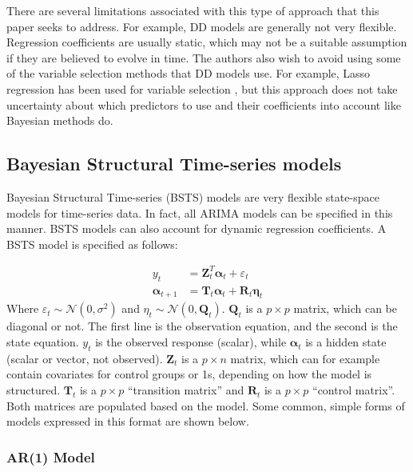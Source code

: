 \documentclass[12pt]{article}
\begin{document}
There are several limitations associated with this type of approach that this paper seeks to address. For example, DD models are generally not very flexible. Regression coefficients are usually static, which may not be a suitable assumption if they are believed to evolve in time. The authors also wish to avoid using some of the variable selection methods that DD models use. For example, Lasso regression has been used for variable selection \cite{belloni2015program}, but this approach does not take uncertainty about which predictors to use and their coefficients into account like Bayesian methods do.

\subsection{Bayesian Structural Time-series models}
Bayesian Structural Time-series (BSTS) models are very flexible state-space models for time-series data. In fact, all ARIMA models can be specified in this manner. BSTS models can also account for dynamic regression coefficients. A BSTS model is specified as follows:

\begin{align} 
y_t &= \boldsymbol{Z}_t^T\boldsymbol{\alpha}_t + \varepsilon_t\\ \label{eq}
\boldsymbol{\alpha}_{t+1} &= \boldsymbol{T}_t \boldsymbol{\alpha}_t + \boldsymbol{R}_t \boldsymbol{\eta}_t \label{eq1}
\end{align}
Where $\varepsilon_t \sim \mathcal{N}(0, \sigma^2)$ and 
$\eta_t \sim \mathcal{N}(0, \boldsymbol{Q}_t)$. $ \boldsymbol{Q}_t$ is a $p \times p$ matrix, which can be diagonal or not. The first line is the observation equation, and the second is the state equation. $y_t$ is the observed response (scalar), while $\boldsymbol{\alpha}_t$ is a hidden state (scalar or vector, not observed). $\boldsymbol{Z}_t$ is a $p \times n$ matrix, which can for example contain covariates for control groups or  1s, depending on how the model is structured.  $\boldsymbol{T}_t$ is a $p \times p$ ``transition matrix'' and $\boldsymbol{R}_t$ is a $p \times p$ ``control matrix''. Both matrices are populated based on the model. Some common, simple forms of models expressed in this format are shown below. \\

\subsubsection{AR(1) Model}
\end{document}
